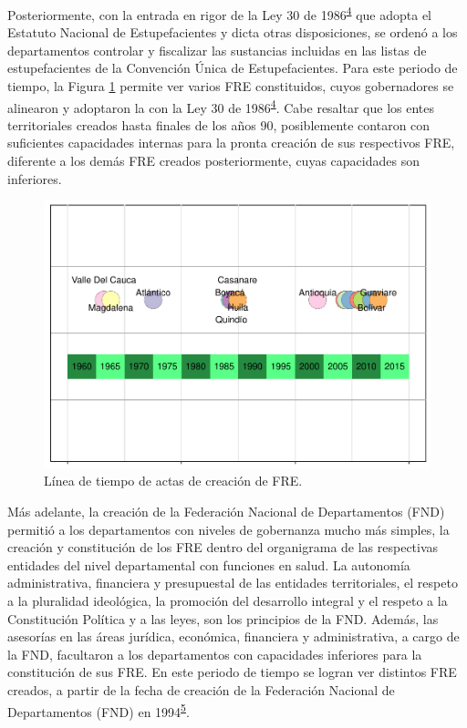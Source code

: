 \documentclass[
]{book}
\begin{document}
Posteriormente, con la entrada en rigor de la Ley 30 de 1986\textsuperscript{\protect\hyperlink{ref-CongresodelaRepublicadeColombia1986}{4}} que adopta el Estatuto Nacional de Estupefacientes y dicta otras disposiciones, se ordenó a los departamentos controlar y fiscalizar las sustancias incluidas en las listas de estupefacientes de la Convención Única de Estupefacientes. Para este periodo de tiempo, la Figura \ref{fig:serieTiempoCreacion} permite ver varios FRE constituidos, cuyos gobernadores se alinearon y adoptaron la con la Ley 30 de 1986\textsuperscript{\protect\hyperlink{ref-CongresodelaRepublicadeColombia1986}{4}}. Cabe resaltar que los entes territoriales creados hasta finales de los años 90, posiblemente contaron con suficientes capacidades internas para la pronta creación de sus respectivos FRE, diferente a los demás FRE creados posteriormente, cuyas capacidades son inferiores.

\begin{figure}[h]

{\centering \includegraphics[width=1\linewidth]{InformeFinal_files/figure-latex/serieTiempoCreacion-1} 

}

\caption{Línea de tiempo de actas de creación de FRE.}\label{fig:serieTiempoCreacion}
\end{figure}

Más adelante, la creación de la Federación Nacional de Departamentos (FND) permitió a los departamentos con niveles de gobernanza mucho más simples, la creación y constitución de los FRE dentro del organigrama de las respectivas entidades del nivel departamental con funciones en salud. La autonomía administrativa, financiera y presupuestal de las entidades territoriales, el respeto a la pluralidad ideológica, la promoción del desarrollo integral y el respeto a la Constitución Política y a las leyes, son los principios de la FND. Además, las asesorías en las áreas jurídica, económica, financiera y administrativa, a cargo de la FND, facultaron a los departamentos con capacidades inferiores para la constitución de sus FRE. En este periodo de tiempo se logran ver distintos FRE creados, a partir de la fecha de creación de la Federación Nacional de Departamentos (FND) en 1994\textsuperscript{\protect\hyperlink{ref-FederacionNacionaldeDepartamentos2021}{5}}.
\end{document}

